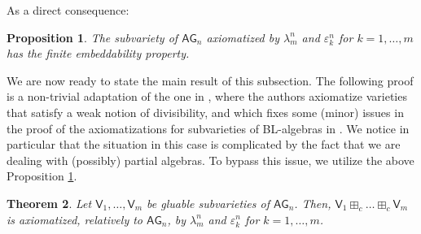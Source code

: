 \documentclass{amsart}
\newtheorem{theorem}{Theorem}[section]
\newtheorem{proposition}[theorem]{Proposition}
\theoremstyle{definition}
\numberwithin{equation}{section}
\newcommand{\vv}[1]{\mathsf {#1}}
\newcommand{\BG}{\vv{AG}}
\begin{document}
As a direct consequence:
\begin{proposition}\label{corollary: FMP K}
	The subvariety of $\BG_n$ axiomatized by $\lambda_m^n$ and $\varepsilon_k^n$ for $k=1, \dots, m$ has the finite embeddability property.
\end{proposition}
We are now ready to state the main result of this subsection. The following proof is a non-trivial adaptation of the one in \cite{GalatosUgolinimanuscript}, where the authors axiomatize varieties that satisfy a weak notion of divisibility, and which fixes some (minor) issues in the proof of the axiomatizations for subvarieties of BL-algebras in \cite[Theorem 5.1]{AM2003}. We notice in particular that the situation in this case is complicated by the fact that we are dealing with (possibly) partial algebras. To bypass this issue, we utilize the above Proposition \ref{corollary: FMP K}. 
\begin{theorem}\label{theorem: axiomatization of unbounded subvarieties}
	Let $\vv V_1, \dots , \vv V_m$ be gluable subvarieties of $\BG_n$. Then, $\vv V_1 \boxplus_c \dots \boxplus_c \vv V_m$ is axiomatized, relatively to $\BG_n$, by $\lambda_m^n$ and $\varepsilon_k^n$ for $k=1, \dots, m$.
\end{theorem}
\end{document}
